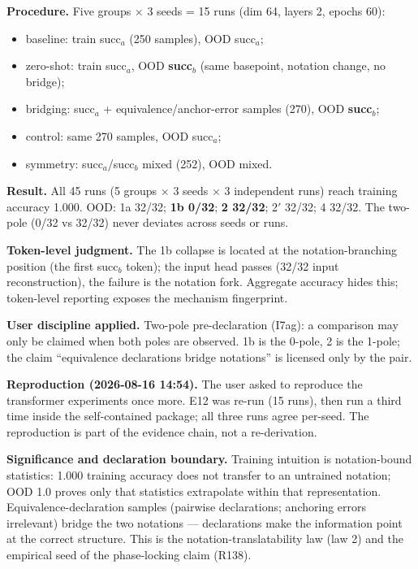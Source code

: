 \documentclass[sigplan,10pt,anonymous,review]{acmart}
\begin{document}
\textbf{Procedure.} Five groups $\times$ 3 seeds = 15 runs (dim 64, layers
2, epochs 60):
\begin{itemize}
\item[1a] baseline: train succ$_a$ (250 samples), OOD succ$_a$;
\item[1b] zero-shot: train succ$_a$, OOD \textbf{succ$_b$} (same basepoint,
notation change, no bridge);
\item[2] bridging: succ$_a$ + equivalence/anchor-error samples (270), OOD
\textbf{succ$_b$};
\item[2$'$] control: same 270 samples, OOD succ$_a$;
\item[4] symmetry: succ$_a$/succ$_b$ mixed (252), OOD mixed.
\end{itemize}

\textbf{Result.} All 45 runs (5 groups $\times$ 3 seeds $\times$ 3
independent runs) reach training accuracy 1.000. OOD: 1a 32/32; \textbf{1b
0/32}; \textbf{2 32/32}; 2$'$ 32/32; 4 32/32. The two-pole (0/32 vs 32/32)
never deviates across seeds or runs.

\textbf{Token-level judgment.} The 1b collapse is located at the
notation-branching position (the first succ$_b$ token); the input head
passes (32/32 input reconstruction), the failure is the notation fork.
Aggregate accuracy hides this; token-level reporting exposes the
mechanism fingerprint.

\textbf{User discipline applied.} Two-pole pre-declaration (I7ag): a
comparison may only be claimed when both poles are observed. 1b is the
0-pole, 2 is the 1-pole; the claim ``equivalence declarations bridge
notations'' is licensed only by the pair.

\textbf{Reproduction (2026-08-16 14:54).} The user asked to reproduce the
transformer experiments once more. E12 was re-run (15 runs), then run a
third time inside the self-contained package; all three runs agree
per-seed. The reproduction is part of the evidence chain, not a
re-derivation.

\textbf{Significance and declaration boundary.} Training intuition is
notation-bound statistics: 1.000 training accuracy does not transfer to an
untrained notation; OOD 1.0 proves only that statistics extrapolate within
that representation. Equivalence-declaration samples (pairwise
declarations; anchoring errors irrelevant) bridge the two notations ---
declarations make the information point at the correct structure. This is
the notation-translatability law (law 2) and the empirical seed of the
phase-locking claim (R138).
\end{document}
